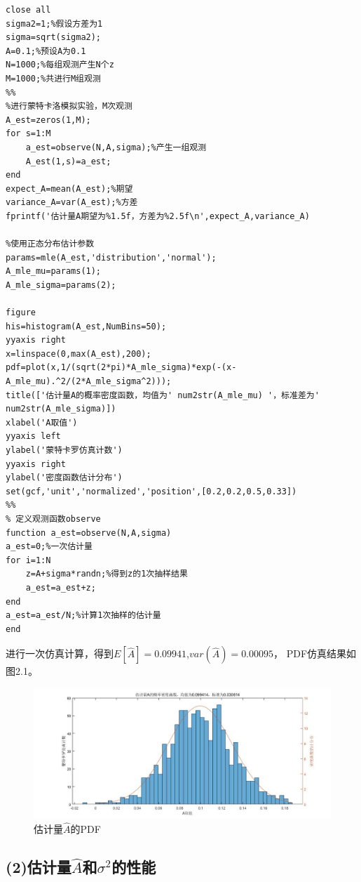 \documentclass[fontset=windows]{article}
\numberwithin{figure}{section}
\begin{document}
\begin{lstlisting}
close all
sigma2=1;%假设方差为1
sigma=sqrt(sigma2);
A=0.1;%预设A为0.1
N=1000;%每组观测产生N个z
M=1000;%共进行M组观测
%%
%进行蒙特卡洛模拟实验，M次观测
A_est=zeros(1,M);
for s=1:M
	a_est=observe(N,A,sigma);%产生一组观测
	A_est(1,s)=a_est;
end
expect_A=mean(A_est);%期望
variance_A=var(A_est);%方差
fprintf('估计量A期望为%1.5f，方差为%2.5f\n',expect_A,variance_A)

%使用正态分布估计参数
params=mle(A_est,'distribution','normal');
A_mle_mu=params(1);
A_mle_sigma=params(2);

figure
his=histogram(A_est,NumBins=50);
yyaxis right
x=linspace(0,max(A_est),200);
pdf=plot(x,1/(sqrt(2*pi)*A_mle_sigma)*exp(-(x-A_mle_mu).^2/(2*A_mle_sigma^2)));
title(['估计量A的概率密度函数，均值为' num2str(A_mle_mu) '，标准差为' num2str(A_mle_sigma)])
xlabel('A取值')
yyaxis left
ylabel('蒙特卡罗仿真计数')
yyaxis right
ylabel('密度函数估计分布')
set(gcf,'unit','normalized','position',[0.2,0.2,0.5,0.33])
%%
% 定义观测函数observe
function a_est=observe(N,A,sigma)
a_est=0;%一次估计量
for i=1:N
	z=A+sigma*randn;%得到z的1次抽样结果
	a_est=a_est+z;
end
a_est=a_est/N;%计算1次抽样的估计量
end
\end{lstlisting}
进行一次仿真计算，得到\(E[\hat{A}]=0.09941\),\(var(\hat{A})=0.00095\)，
PDF仿真结果如图2.1。
\begin{figure}[H]
	\centering
	\includegraphics[scale=0.4]{fig2.1.jpg}
	\caption{估计量\(\hat{A}\)的PDF}
	\label{2.1}
\end{figure}

\subsection*{(2)估计量\(\hat{A}\)和\(\sigma^2\)的性能}
\end{document}
